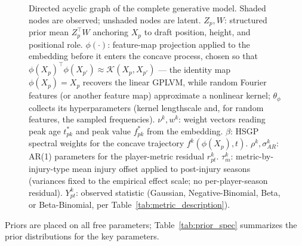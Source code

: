 \begin{figure}[ht]
{
}
\caption{Directed acyclic graph of the complete generative model. Shaded nodes are observed; unshaded nodes are latent. $Z_p, W$: structured prior mean $Z_p^\top W$ anchoring $X_p$ to draft position, height, and positional role. $\phi(\cdot)$: feature-map projection applied to the embedding before it enters the concave process, chosen so that $\phi(X_p)^\top\phi(X_{p'})\approx\mathcal{K}(X_p,X_{p'})$ --- the identity map $\phi(X_p)=X_p$ recovers the linear GPLVM, while random Fourier features (or another feature map) approximate a nonlinear kernel; $\theta_\phi$ collects its hyperparameters (kernel lengthscale and, for random features, the sampled frequencies). $\nu^k, w^k$: weight vectors reading peak age $t^*_{pk}$ and peak value $f^*_{pk}$ from the embedding. $\beta$: HSGP spectral weights for the concave trajectory $f^k(\phi(X_p),t)$. $\rho^k, \sigma^k_{AR}$: AR(1) parameters for the player-metric residual $r^k_{pt}$. $\tau^k_m$: metric-by-injury-type mean injury offset applied to post-injury seasons (variances fixed to the empirical effect scale; no per-player-season residual). $Y^k_{pt}$: observed statistic (Gaussian, Negative-Binomial, Beta, or Beta-Binomial, per Table~\ref{tab:metric_description}).}
\label{fig:graphical_model}
\end{figure}

\noindent Priors are placed on all free parameters; Table~\ref{tab:prior_spec} summarizes the prior distributions for the key parameters.

